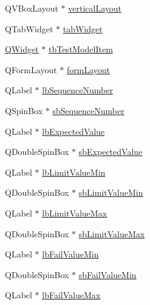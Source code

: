 \begin{DoxyCompactItemize}
\item 
Q\-V\-Box\-Layout $\ast$ \hyperlink{class_ui__mdt_tt_test_model_item_dialog_ab9d49ef493d8a1e57d1d15f2eed4a85f}{vertical\-Layout}
\item 
Q\-Tab\-Widget $\ast$ \hyperlink{class_ui__mdt_tt_test_model_item_dialog_ab3a5d1e5fee31a51447e66970d97ec34}{tab\-Widget}
\item 
\hyperlink{class_q_widget}{Q\-Widget} $\ast$ \hyperlink{class_ui__mdt_tt_test_model_item_dialog_a3f8d368b30537ea891446850c9a14169}{tb\-Test\-Model\-Item}
\item 
Q\-Form\-Layout $\ast$ \hyperlink{class_ui__mdt_tt_test_model_item_dialog_a68c02a58311dda26d6512a9d5dd0db02}{form\-Layout}
\item 
Q\-Label $\ast$ \hyperlink{class_ui__mdt_tt_test_model_item_dialog_abea0311fd80b2e6656ee652cfe936634}{lb\-Sequence\-Number}
\item 
Q\-Spin\-Box $\ast$ \hyperlink{class_ui__mdt_tt_test_model_item_dialog_a66803ed86dfd373dac31f077c44bcf41}{sb\-Sequence\-Number}
\item 
Q\-Label $\ast$ \hyperlink{class_ui__mdt_tt_test_model_item_dialog_a71d811dd8130e8fafff219d8735abdcc}{lb\-Expected\-Value}
\item 
Q\-Double\-Spin\-Box $\ast$ \hyperlink{class_ui__mdt_tt_test_model_item_dialog_a1f36ff5ef9cdce71515249b61db66c4a}{sb\-Expected\-Value}
\item 
Q\-Label $\ast$ \hyperlink{class_ui__mdt_tt_test_model_item_dialog_a0f8d45555f16f0c6d55d0aa1f50d194a}{lb\-Limit\-Value\-Min}
\item 
Q\-Double\-Spin\-Box $\ast$ \hyperlink{class_ui__mdt_tt_test_model_item_dialog_a13be08211a42b3849150f2628c47d82e}{sb\-Limit\-Value\-Min}
\item 
Q\-Label $\ast$ \hyperlink{class_ui__mdt_tt_test_model_item_dialog_a7ae569a76e9b639a46323af0c9bae83b}{lb\-Limit\-Value\-Max}
\item 
Q\-Double\-Spin\-Box $\ast$ \hyperlink{class_ui__mdt_tt_test_model_item_dialog_aab2598753cacf2f117051018aadd9af3}{sb\-Limit\-Value\-Max}
\item 
Q\-Label $\ast$ \hyperlink{class_ui__mdt_tt_test_model_item_dialog_a55bd0bb0a250181fb20ed1b95f9f053d}{lb\-Fail\-Value\-Min}
\item 
Q\-Double\-Spin\-Box $\ast$ \hyperlink{class_ui__mdt_tt_test_model_item_dialog_af71bdb2d62648cd941f931fa061fe70f}{sb\-Fail\-Value\-Min}
\item 
Q\-Label $\ast$ \hyperlink{class_ui__mdt_tt_test_model_item_dialog_a31ddda4aacca73964d0c13b71462cc59}{lb\-Fail\-Value\-Max}

\end{DoxyCompactItemize}
